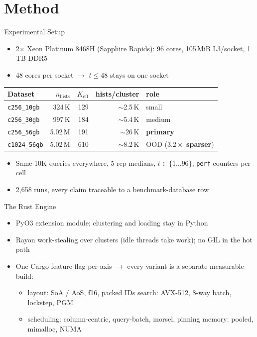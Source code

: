 \documentclass[aspectratio=169,10pt]{beamer}
\begin{document}
\section{Method}

\begin{frame}{Experimental Setup}
  \begin{itemize}
    \item 2$\times$ Xeon Platinum 8468H (Sapphire Rapids): 96 cores, 105\,MiB L3/socket, 1\,TB DDR5
    \item 48 cores per socket $\to$ $t \leq 48$ stays on one socket
  \end{itemize}
  \begin{center}
    \small
    \begin{tabular}{lrrrl}
      \toprule
      Dataset & $n_\text{hists}$ & $K_\text{eff}$ & hists/cluster & role \\
      \midrule
      \texttt{c256\_10gb}  & 324\,K  & 129 & $\sim$2.5\,K & small \\
      \texttt{c256\_30gb}  & 997\,K  & 184 & $\sim$5.4\,K & medium \\
      \texttt{c256\_56gb}  & 5.02\,M & 191 & $\sim$26\,K  & \textbf{primary} \\
      \texttt{c1024\_56gb} & 5.02\,M & 610 & $\sim$8.2\,K & OOD ($3.2\times$ \textbf{sparser}) \\
      \bottomrule
    \end{tabular}
  \end{center}
  \begin{itemize}
    \item Same 10K queries everywhere, 5-rep medians, $t \in \{1 \dots 96\}$, \texttt{perf} counters per cell
    \item 2{,}658 runs, every claim traceable to a benchmark-database row
  \end{itemize}
\end{frame}

\begin{frame}{The Rust Engine}
  \begin{itemize}
    \item PyO3 extension module; clustering and loading stay in Python
    \item Rayon work-stealing over clusters (idle threads take work); no GIL in the hot path
    \item One Cargo feature flag per axis $\to$ every variant is a separate measurable build:
    \begin{itemize}
      \item layout: SoA / AoS, f16, packed IDs \quad search: AVX-512, 8-way batch, lockstep, PGM
      \item scheduling: column-centric, query-batch, morsel, pinning \quad memory: pooled, mimalloc, NUMA
    \end{itemize}
  \end{itemize}
\end{frame}
\end{document}
